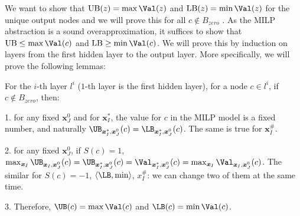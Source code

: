 				
				We want to show that $\mathrm{UB}(z) = \max \Val (z)$ and $\mathrm{LB}(z) = \min \Val(z)$ for the unique output nodes and we will prove this for all $c\notin B_{zero}$ . As the MILP abstraction is a sound overapproximation, 
				it suffices to show that $\mathrm{UB}\leq \max \Val(c)$ and $\mathrm{LB} \geq \min \Val(c)$. We will prove this by induction on layers from the first hidden layer to the output layer. More specifically, we will prove the following lemmas:
				
				
				\begin{lemma}
					For the $i$-th layer $l^i$ ($1$-th layer is the first hidden layer), for a node $c\in l^i$, if $c\notin B_{zero}$, then:
					
					\vspace*{1ex}
					
					1. for any fixed $\boldsymbol{x}^0_J$ and for $\boldsymbol{x}^*_I$, the value for $c$ in the MILP model is a fixed number, and naturally $\UB_{\boldsymbol{x}^*_I,\boldsymbol{x}^0_J}(c)=\LB_{\boldsymbol{x}^*_I,\boldsymbol{x}^0_J}(c)$. The same is true for $\boldsymbol{x}^\#_I$.
					
					\vspace*{1ex}
					
					2. for any fixed $\boldsymbol{x}^0_J$, if $S(c)=1$,  $\max_{\boldsymbol{x}_I} \UB_{\boldsymbol{x}_I,\boldsymbol{x}^0_J}(c)=\UB_{\boldsymbol{x}^*_I,\boldsymbol{x}^0_J}(c)= \Val_{\boldsymbol{x}^*_I,\boldsymbol{x}^0_J}(c) = \max_{\boldsymbol{x}_I} \Val_{\boldsymbol{x}_I,\boldsymbol{x}^0_J}(c)$. The similar for $S(c)=-1$, $\langle \LB,\min\rangle$, $x^\#_I$: we can change two of them at the same time.
					
					\vspace*{1ex}
					
					3. Therefore, $\UB(c)=\max\Val(c)$ and $\LB(c)=\min\Val(c)$.
					
					
				\end{lemma}
				
